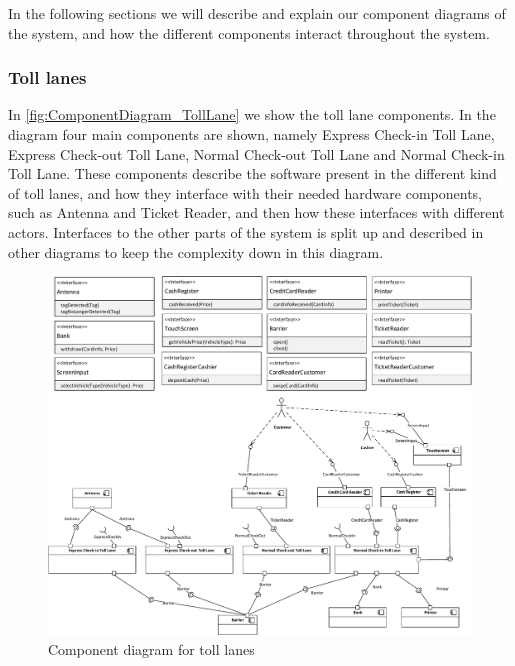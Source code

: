 
In the following sections we will describe and explain our component diagrams of the system, and how the different components interact throughout the system.
\subsubsection*{Toll lanes}
In \autoref{fig:ComponentDiagram_TollLane} we show the toll lane components. In the diagram four main components are shown, namely Express Check-in Toll Lane, Express Check-out Toll Lane, Normal Check-out Toll Lane and Normal Check-in Toll Lane. These components describe the software present in the different kind of toll lanes, and how they interface with their needed hardware components, such as Antenna and Ticket Reader, and then how these interfaces with different actors. Interfaces to the other parts of the system is split up and described in other diagrams to keep the complexity down in this diagram.
\begin{figure}[H]
\centering
\includegraphics[width=1\textwidth]{img/component_diagrams/componentdiagram_tolllane}
\caption{Component diagram for toll lanes}
\label{fig:ComponentDiagram_TollLane}
\end{figure}

